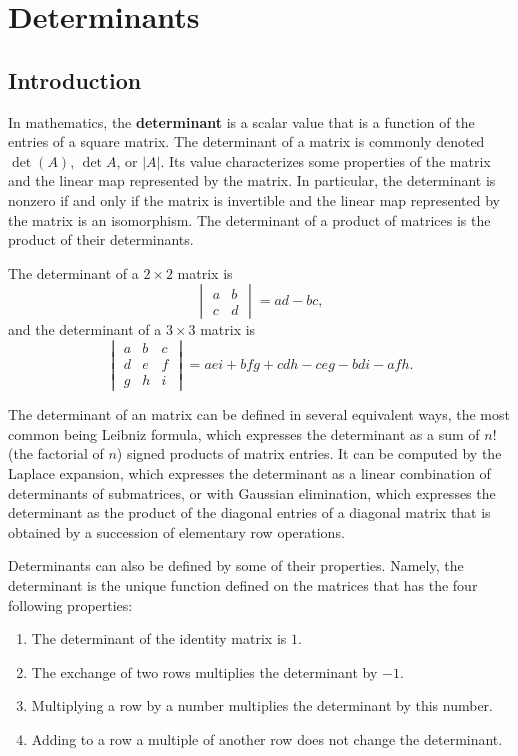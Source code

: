\chapter{Determinants}

\section{Introduction}

In mathematics, the \textbf{determinant} is a scalar value that is a
function of the entries of a square matrix. The determinant of a
matrix is commonly denoted $\det(A)$, $\det A$, or
$|A|$. Its value characterizes some properties of the matrix and the
linear map represented by the matrix.  In particular, the determinant
is nonzero if and only if the matrix is invertible and the linear map
represented by the matrix is an isomorphism. The determinant of a
product of matrices is the product of their determinants.

The determinant of a $2 \times 2$ matrix is
$$\begin{vmatrix} a & b\\c & d \end{vmatrix}=ad-bc,$$
and the determinant of a $3 \times 3$ matrix is
$$\begin{vmatrix} a & b & c \\ d & e & f \\ g & h & i \end{vmatrix}=
aei + bfg + cdh - ceg - bdi - afh.$$

The determinant of an matrix can be defined in several equivalent
ways, the most common being Leibniz formula, which expresses the
determinant as a sum of $n!$ (the factorial of $n$) signed products of
matrix entries. It can be computed by the Laplace expansion, which
expresses the determinant as a linear combination of determinants of
submatrices, or with Gaussian elimination, which expresses the
determinant as the product of the diagonal entries of a diagonal
matrix that is obtained by a succession of elementary row operations.

Determinants can also be defined by some of their properties. Namely,
the determinant is the unique function defined on the matrices that
has the four following properties:

\begin{enumerate}
\item The determinant of the identity matrix is $1$.
\item The exchange of two rows multiplies the determinant by
  $-1$. \label{row_exchange}
\item Multiplying a row by a number multiplies the determinant by this
  number. \label{row_multiple}
\item Adding to a row a multiple of another row does not change the
  determinant. \label{row_add}
\end{enumerate}

